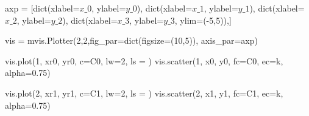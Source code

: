 \documentclass[
  letterpaper,
  DIV=11,
  numbers=noendperiod]{scrreprt}
\newenvironment{Shaded}{\begin{snugshade}}{\end{snugshade}}
\newcommand{\BuiltInTok}[1]{\textcolor[rgb]{0.00,0.23,0.31}{#1}}
\newcommand{\DecValTok}[1]{\textcolor[rgb]{0.68,0.00,0.00}{#1}}
\newcommand{\FloatTok}[1]{\textcolor[rgb]{0.68,0.00,0.00}{#1}}
\newcommand{\NormalTok}[1]{\textcolor[rgb]{0.00,0.23,0.31}{#1}}
\newcommand{\OperatorTok}[1]{\textcolor[rgb]{0.37,0.37,0.37}{#1}}
\newcommand{\StringTok}[1]{\textcolor[rgb]{0.13,0.47,0.30}{#1}}
\begin{document}
\begin{Shaded}
\begin{Highlighting}[]
\NormalTok{axp }\OperatorTok{=}\NormalTok{ [}\BuiltInTok{dict}\NormalTok{(xlabel}\OperatorTok{=}\StringTok{\textquotesingle{}$x\_0$\textquotesingle{}}\NormalTok{, ylabel}\OperatorTok{=}\StringTok{\textquotesingle{}$y\_0$\textquotesingle{}}\NormalTok{),}
        \BuiltInTok{dict}\NormalTok{(xlabel}\OperatorTok{=}\StringTok{\textquotesingle{}$x\_1$\textquotesingle{}}\NormalTok{, ylabel}\OperatorTok{=}\StringTok{\textquotesingle{}$y\_1$\textquotesingle{}}\NormalTok{),}
        \BuiltInTok{dict}\NormalTok{(xlabel}\OperatorTok{=}\StringTok{\textquotesingle{}$x\_2$\textquotesingle{}}\NormalTok{, ylabel}\OperatorTok{=}\StringTok{\textquotesingle{}$y\_2$\textquotesingle{}}\NormalTok{),}
        \BuiltInTok{dict}\NormalTok{(xlabel}\OperatorTok{=}\StringTok{\textquotesingle{}$x\_3$\textquotesingle{}}\NormalTok{, ylabel}\OperatorTok{=}\StringTok{\textquotesingle{}$y\_3$\textquotesingle{}}\NormalTok{, ylim}\OperatorTok{=}\NormalTok{(}\OperatorTok{{-}}\DecValTok{5}\NormalTok{,}\DecValTok{5}\NormalTok{)),]}

\NormalTok{vis }\OperatorTok{=}\NormalTok{ mvis.Plotter(}\DecValTok{2}\NormalTok{,}\DecValTok{2}\NormalTok{,fig\_par}\OperatorTok{=}\BuiltInTok{dict}\NormalTok{(figsize}\OperatorTok{=}\NormalTok{(}\DecValTok{10}\NormalTok{,}\DecValTok{5}\NormalTok{)), axis\_par}\OperatorTok{=}\NormalTok{axp)}

\NormalTok{vis.plot(}\DecValTok{1}\NormalTok{, xr0, yr0, c}\OperatorTok{=}\StringTok{\textquotesingle{}C0\textquotesingle{}}\NormalTok{, lw}\OperatorTok{=}\DecValTok{2}\NormalTok{, ls }\OperatorTok{=} \StringTok{\textquotesingle{}{-}{-}\textquotesingle{}}\NormalTok{)}
\NormalTok{vis.scatter(}\DecValTok{1}\NormalTok{, x0, y0, fc}\OperatorTok{=}\StringTok{\textquotesingle{}C0\textquotesingle{}}\NormalTok{, ec}\OperatorTok{=}\StringTok{\textquotesingle{}k\textquotesingle{}}\NormalTok{, alpha}\OperatorTok{=}\FloatTok{0.75}\NormalTok{)}

\NormalTok{vis.plot(}\DecValTok{2}\NormalTok{, xr1, yr1, c}\OperatorTok{=}\StringTok{\textquotesingle{}C1\textquotesingle{}}\NormalTok{, lw}\OperatorTok{=}\DecValTok{2}\NormalTok{, ls }\OperatorTok{=} \StringTok{\textquotesingle{}{-}{-}\textquotesingle{}}\NormalTok{)}
\NormalTok{vis.scatter(}\DecValTok{2}\NormalTok{, x1, y1, fc}\OperatorTok{=}\StringTok{\textquotesingle{}C1\textquotesingle{}}\NormalTok{, ec}\OperatorTok{=}\StringTok{\textquotesingle{}k\textquotesingle{}}\NormalTok{, alpha}\OperatorTok{=}\FloatTok{0.75}\NormalTok{)}


\end{Highlighting}
\end{Shaded}
\end{document}
